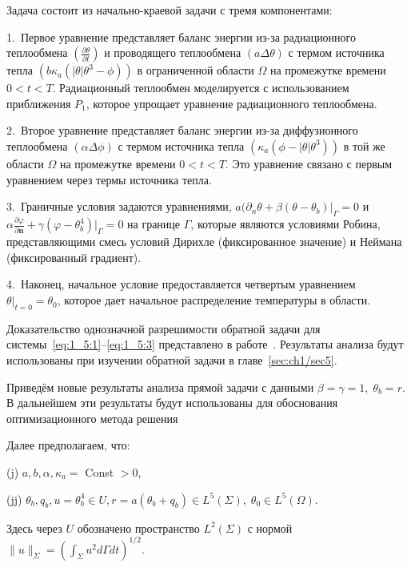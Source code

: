 Задача состоит из начально-краевой задачи с тремя компонентами:


1.\ Первое уравнение представляет баланс энергии из-за радиационного
теплообмена $\left(\frac{\partial \theta}{\partial t}\right)$ и проводящего
теплообмена $(a \Delta \theta)$ с термом источника тепла
$\left(b \kappa_a \left(|\theta| \theta^3 - \phi \right)\right)$
в ограниченной области $\Omega$ на промежутке времени $0 < t < T$.
Радиационный теплообмен моделируется с использованием приближения $P_1$,
которое упрощает уравнение радиационного теплообмена.

2.\ Второе уравнение представляет баланс энергии из-за диффузионного
теплообмена $(\alpha \Delta \phi)$ с термом источника тепла
$\left(\kappa_a \left(\phi - |\theta| \theta^3 \right)\right)$
в той же области $\Omega$ на промежутке времени $0 < t < T$.
Это уравнение связано с первым уравнением через термы источника тепла.

3.\ Граничные условия задаются уравнениями,
$a(\partial_n \theta +\left.\beta\left(\theta-\theta_{b}\right)\right|_{\Gamma}=0$
и $\alpha \frac{\partial \varphi}{\partial \mathbf{n}}
+ \gamma (\varphi-\theta_b^4)|_{\Gamma} = 0$
на границе $\Gamma$, которые являются условиями Робина,
представляющими смесь условий Дирихле
(фиксированное значение) и Неймана (фиксированный градиент).

4.\ Наконец, начальное условие предоставляется четвертым уравнением
$\theta|_{t=0} = \theta_0$, которое дает начальное
распределение температуры в области.

Доказательство однозначной разрешимости обратной задачи для
системы~\eqref{eq:1_5:1}--\eqref{eq:1_5:3} представлено в работе~\cite{JMAA-19}.
Результаты анализа будут использованы при изучении обратной задачи в главе~\ref{sec:ch1/sec5}.

Приведём новые результаты анализа прямой задачи с данными $\beta=\gamma=1, \; \theta_b = r$.
В дальнейшем эти результаты будут использованы для обоснования оптимизационного метода решения

Далее предполагаем, что:

(j) $a, b, \alpha, \kappa_{a} =$ Const $>0$,

(jj) $\theta_{b}, q_{b}, u=\theta^4_b \in U, r
=a\left(\theta_{b}+q_{b}\right) \in L^{5}(\Sigma), \; \theta_{0} \in L^{5}(\Omega)$.


Здесь через $U$ обозначено пространство $L^{2}(\Sigma)$ с нормой
$\|u\|_{\Sigma}=\left(\int_{\Sigma} u^{2} d \Gamma d t\right)^{1/2}$.

